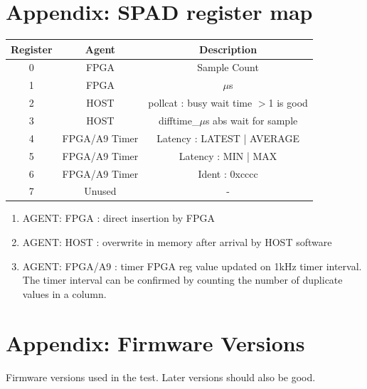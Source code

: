 \documentclass{article}
\begin{document}
\section{Appendix: SPAD register map} \label{spadregmap}

\begin{center}
	\begin{tabular}{||c c c||} 
		\hline
		Register & Agent & Description \\ \hline\hline\hline
		0 & FPGA & Sample Count \\
		\hline
		1 & FPGA & $\mu$s \\
		\hline
		2 & HOST & pollcat : busy wait time $>$1 is good \\
		\hline
		3 & HOST & difftime\_$\mu$s abs wait for sample \\ [1ex] 
		\hline
		4 & FPGA/A9 Timer & Latency : LATEST | AVERAGE \\
		\hline
		5 & FPGA/A9 Timer & Latency : MIN | MAX \\
		\hline
		6 & FPGA/A9 Timer & Ident : 0xcccc \\
		\hline
		7 & Unused & - \\
		\hline
	\end{tabular}
\end{center}

\begin{enumerate}
	\item AGENT: FPGA    : direct insertion by FPGA
	\item AGENT: HOST    : overwrite in memory after arrival by HOST software
	\item AGENT: FPGA/A9 : timer FPGA reg value updated on 1kHz timer interval. The timer interval can be confirmed by counting the number of duplicate values in a column.
\end{enumerate}

\section{Appendix: Firmware Versions} \label{firmware}

Firmware versions used in the test. Later versions should also be good.
\end{document}
